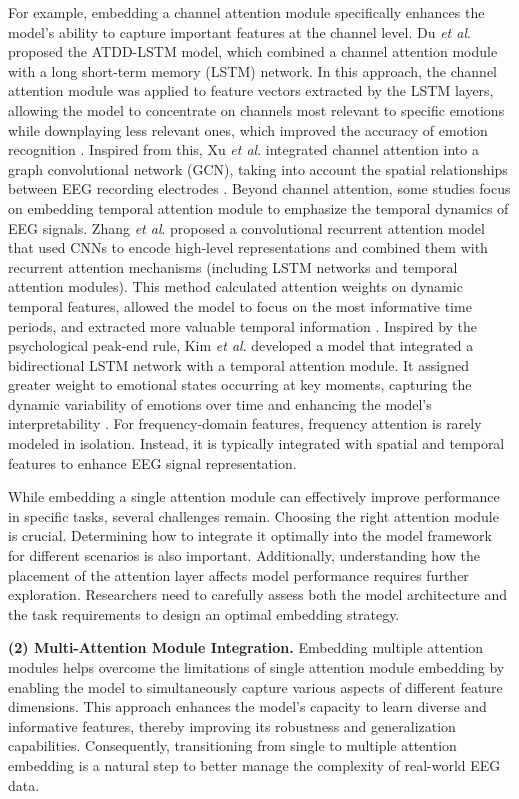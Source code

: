\documentclass[preprint,12pt]{elsarticle}
\newcommand{\etal}{\textit{et al}. }
\begin{document}
For example, embedding a channel attention module specifically enhances the model’s ability to capture important features at the channel level. Du \etal proposed the ATDD-LSTM model, which combined a channel attention module with a long short-term memory (LSTM) network. In this approach, the channel attention module was applied to feature vectors extracted by the LSTM layers, allowing the model to concentrate on channels most relevant to specific emotions while downplaying less relevant ones, which improved the accuracy of emotion recognition \cite{du2020efficient}. Inspired from this, Xu \etal integrated channel attention into a graph convolutional network (GCN), taking into account the spatial relationships between EEG recording electrodes \cite{xu2023dagam}. Beyond channel attention, some studies focus on embedding temporal attention module to emphasize the temporal dynamics of EEG signals. Zhang \etal proposed a convolutional recurrent attention model that used CNNs to encode high-level representations and combined them with recurrent attention mechanisms (including LSTM networks and temporal attention modules). This method calculated attention weights on dynamic temporal features, allowed the model to focus on the most informative time periods, and extracted more valuable temporal information \cite{zhang2019convolutional}. Inspired by the psychological peak-end rule, Kim \etal developed a model that integrated a bidirectional LSTM network with a temporal attention module. It assigned greater weight to emotional states occurring at key moments, capturing the dynamic variability of emotions over time and enhancing the model's interpretability \cite{kim2020eeg}. For frequency-domain features, frequency attention is rarely modeled in isolation. Instead, it is typically integrated with spatial and temporal features to enhance EEG signal representation.

While embedding a single attention module can effectively improve performance in specific tasks, several challenges remain. Choosing the right attention module is crucial. Determining how to integrate it optimally into the model framework for different scenarios is also important. Additionally, understanding how the placement of the attention layer affects model performance requires further exploration. Researchers need to carefully assess both the model architecture and the task requirements to design an optimal embedding strategy.

\textbf{(2) Multi-Attention Module Integration.} Embedding multiple attention modules helps overcome the limitations of single attention module embedding by enabling the model to simultaneously capture various aspects of different feature dimensions. This approach enhances the model’s capacity to learn diverse and informative features, thereby improving its robustness and generalization capabilities. Consequently, transitioning from single to multiple attention embedding is a natural step to better manage the complexity of real-world EEG data.
\end{document}
